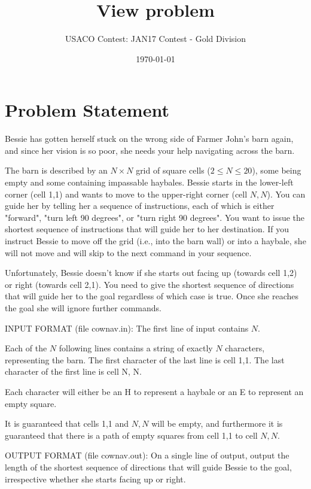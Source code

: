 \documentclass[12pt]{article}
\title{View problem}
\author{USACO Contest: JAN17 Contest - Gold Division}
\date{\today}
\begin{document}
\maketitle

\section*{Problem Statement}

Bessie has gotten herself stuck on the wrong side of Farmer John's barn again,
and since her vision is so poor, she needs your help navigating across the barn.

The barn is described by an $N \times N$ grid of square cells
($2 \leq N \leq 20$), some being empty and some containing impassable haybales. 
Bessie starts in the  lower-left corner (cell 1,1) and wants to move to the
upper-right corner (cell $N,N$).   You can guide her by telling her a sequence
of instructions, each of which is either "forward", "turn left 90 degrees", or
"turn right 90 degrees".  You want to issue the shortest sequence of
instructions that will guide her to her destination.  If you instruct Bessie to
move off the grid (i.e., into the barn wall) or into a haybale, she will not
move and will skip to the next command in your sequence.  

Unfortunately, Bessie doesn't know if she starts out facing up (towards cell
1,2) or right (towards cell 2,1).  You need to give the  shortest sequence of
directions that will guide her to the goal regardless of which case is true. 
Once she reaches the goal she will ignore further commands.

INPUT FORMAT (file cownav.in):
The first line of input contains $N$.

Each of the $N$ following lines contains a string of exactly $N$ characters,
representing the barn. The first character of the last line is cell 1,1. The
last character of the first line is cell N, N. 

Each character will either be an H to represent a haybale or an E to represent
an empty square.

It is guaranteed that cells 1,1 and $N,N$ will be empty, and furthermore it is
guaranteed that there is a path of empty squares from cell 1,1 to cell $N, N$.

OUTPUT FORMAT (file cownav.out):
On a single line of output, output the length of the shortest sequence of
directions that will guide Bessie to the goal, irrespective whether she starts
facing up or right.
\end{document}
